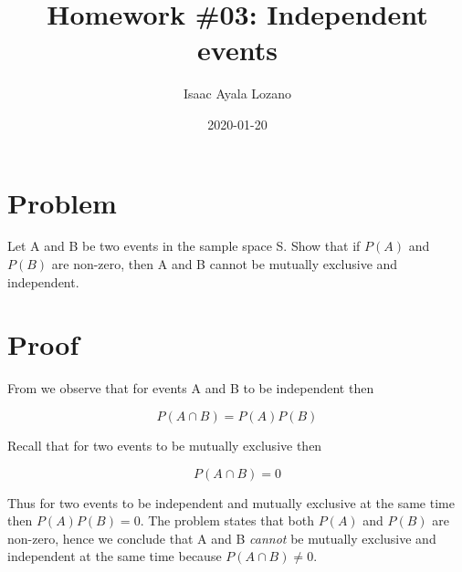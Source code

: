 \documentclass[a4paper,12pt]{article}
\title{Homework \#03: Independent events}
\author{Isaac Ayala Lozano}
\date{2020-01-20}
\begin{document}
\maketitle

\section{Problem}
Let A and B be two events in the sample space S. 
Show that if $P(A) $ and $P(B)$ are
non-zero, then A and B cannot be mutually exclusive and independent.

\section{Proof}

From \cite{stewart2009probability} we observe that for events A and B to be independent then

\begin{equation}
 P(A \cap B) = P(A) P(B)
\end{equation}

Recall that for two events to be mutually exclusive then

\begin{equation}
 P(A \cap B) = 0
\end{equation}

Thus for two events to be independent and mutually exclusive at the same time then $P(A) P(B) = 0$.
The problem states that both $P(A)$ and $P(B)$ are non-zero, hence we conclude that A and B \emph{cannot} be mutually exclusive and independent at the same time because $P(A\cap B)  \neq 0$.

\printbibliography
\end{document}
